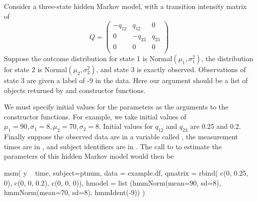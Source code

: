 Consider a three-state hidden Markov model, with a transition
intensity matrix of
\[
Q = \left(
  \begin{array}{llll}
    -q_{12} & q_{12} &  0  \\
    0  & -q_{23} & q_{23}\\
    0    &   0    &   0   \\
  \end{array}
\right )
\]
Suppose the outcome distribution for state 1 is Normal$(\mu_1,
\sigma^2_1)$, the distribution for state 2 is Normal$(\mu_2,
\sigma^2_2)$, and state 3 is exactly observed. Observations of state 3
are given a label of -9 in the data.  Here our 
argument should be a list of objects returned by  and
 constructor functions.

We must specify initial values for the parameters as the arguments to
the constructor functions.  For example, we take initial values of
$\mu_1 = 90, \sigma_1 = 8, \mu_2 = 70, \sigma_2 = 8$.  Initial values
for $q_{12}$ and $q_{23}$ are 0.25 and 0.2. Finally suppose the
observed data are in a variable called , the measurement
times are in , and subject identifiers are in
.  The call to  to estimate the
parameters of this hidden Markov model would then be
\begin{Scode}
  msm( y ~ time, subject=ptnum, data = example.df,
  qmatrix = rbind( c(0, 0.25, 0), c(0, 0, 0.2), c(0, 0, 0)),
  hmodel = list (hmmNorm(mean=90, sd=8), hmmNorm(mean=70, sd=8),
                 hmmIdent(-9)) )
\end{Scode}


